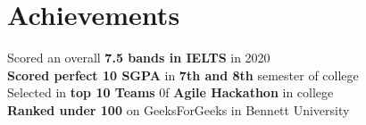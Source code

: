 \documentclass[letterpaper,11pt]{article}
\makeatletter
\newcommand{\resumeItem}[1]{
  \item\small{
    {#1 \vspace{-2pt}}
  }
}
\newcommand{\resumeProjectHeading}[2]{
    \item
    \begin{tabular*}{1.001\textwidth}{l@{\extracolsep{\fill}}r}
      \small#1 & \textbf{\small #2}\\
    \end{tabular*}\vspace{-7pt}
}
\newcommand{\resumeSubHeadingListStart}{\begin{itemize}[leftmargin=0.0in, label={}]}
\newcommand{\resumeSubHeadingListEnd}{\end{itemize}}
\newcommand{\resumeItemListStart}{\begin{itemize}}
\newcommand{\resumeItemListEnd}{\end{itemize}\vspace{-5pt}}
\makeatother
\begin{document}
   \section{Achievements}
 \begin{itemize}[leftmargin=0.15in, label={}]
    \small{\item{
     {Scored an overall \textbf{7.5 bands in IELTS} in 2020} \\
     {\textbf{Scored perfect 10 SGPA} in \textbf{7th and 8th} semester of college} \\
     {Selected in \textbf{top 10 Teams} 0f \textbf{Agile Hackathon} in college}\\
     {\textbf{Ranked under 100 } on GeeksForGeeks in Bennett University}
    }}
 \end{itemize}
\vspace{-16pt}
\end{document}
